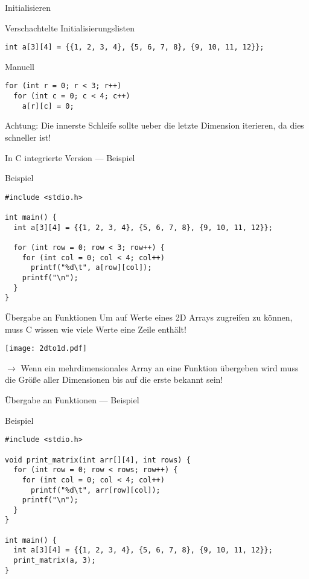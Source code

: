 \documentclass[presentation]{beamer}
\begin{document}
\begin{frame}[label={sec:orge0c6000},fragile]{Initialisieren}
 \begin{block}{Verschachtelte Initialisierungslisten}
\begin{verbatim}
int a[3][4] = {{1, 2, 3, 4}, {5, 6, 7, 8}, {9, 10, 11, 12}};
\end{verbatim}
\end{block}
\begin{block}{Manuell}
\begin{verbatim}
for (int r = 0; r < 3; r++)
  for (int c = 0; c < 4; c++)
    a[r][c] = 0;
\end{verbatim}
Achtung: Die innerste Schleife sollte ueber die letzte Dimension
iterieren, da dies schneller ist!
\end{block}
\end{frame}
\begin{frame}[label={sec:orgf7f7b02},fragile]{In C integrierte Version --- Beispiel}
 \begin{block}{Beispiel}
\begin{verbatim}
#include <stdio.h>

int main() {
  int a[3][4] = {{1, 2, 3, 4}, {5, 6, 7, 8}, {9, 10, 11, 12}};

  for (int row = 0; row < 3; row++) {
    for (int col = 0; col < 4; col++)
      printf("%d\t", a[row][col]);
    printf("\n");
  }
}
\end{verbatim}
\end{block}
\end{frame}

\begin{frame}[label={sec:org51ac190}]{Übergabe an Funktionen}
Um auf Werte eines 2D Arrays zugreifen zu können, muss C wissen wie
viele Werte eine Zeile enthält!
\begin{center}
\texttt{[image: 2dto1d.pdf]}
\end{center} 

\(\rightarrow\) Wenn ein mehrdimensionales Array \alert{an eine Funktion
übergeben} wird muss die Größe aller Dimensionen bis auf die erste
\alert{bekannt} sein!
\end{frame}
\begin{frame}[label={sec:org56f17cd},fragile]{Übergabe an Funktionen --- Beispiel}
 \begin{block}{Beispiel}
\begin{verbatim}
#include <stdio.h>

void print_matrix(int arr[][4], int rows) {
  for (int row = 0; row < rows; row++) {
    for (int col = 0; col < 4; col++)
      printf("%d\t", arr[row][col]);
    printf("\n");
  }
}

int main() {
  int a[3][4] = {{1, 2, 3, 4}, {5, 6, 7, 8}, {9, 10, 11, 12}};
  print_matrix(a, 3);
}
\end{verbatim}
\end{block}
\end{frame}
\end{document}
